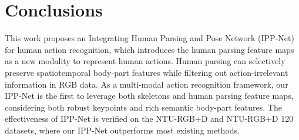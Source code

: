 \documentclass[runningheads]{llncs}
\begin{document}
\section{Conclusions}
This work proposes an Integrating Human Parsing and Pose Network (IPP-Net) for human action recognition, which introduces the human parsing feature maps as a new modality to represent human actions. Human parsing can selectively preserve spatiotemporal body-part features while filtering out action-irrelevant information in RGB data. As a multi-modal action recognition framework, our IPP-Net is the first to leverage both skeletons and human parsing feature maps, considering both robust keypoints and rich semantic body-part features. The effectiveness of IPP-Net is verified on the NTU-RGB+D and NTU-RGB+D 120 datasets, where our IPP-Net outperforms most existing methods.

\normalem


\end{document}
